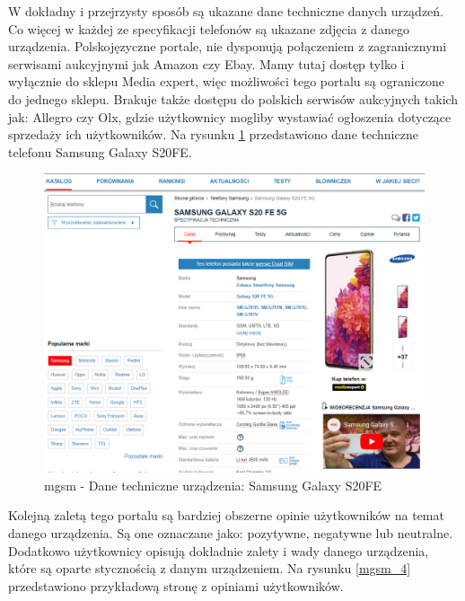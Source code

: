 W dokładny i przejrzysty sposób są ukazane dane techniczne danych urządzeń. Co więcej w każdej ze specyfikacji telefonów są ukazane zdjęcia z danego urządzenia. Polskojęzyczne portale, nie dysponują połączeniem z zagranicznymi serwisami aukcyjnymi jak Amazon czy Ebay. Mamy tutaj dostęp tylko i wyłącznie do sklepu Media expert, więc możliwości tego portalu są ograniczone do jednego sklepu.
Brakuje także dostępu do polskich serwisów aukcyjnych takich jak: Allegro czy Olx, gdzie użytkownicy mogliby wystawiać ogłoszenia dotyczące sprzedaży ich użytkowników. Na rysunku \ref*{mgsm_3} przedstawiono dane techniczne telefonu Samsung Galaxy S20FE.
\begin{figure}[H]
    \centering
    \includegraphics[scale=0.48]{img/mgsm/DetailsMgsm.png}
    \caption{mgsm - Dane techniczne urządzenia: Samsung Galaxy S20FE}
    \label{mgsm_3}
\end{figure}
Kolejną zaletą tego portalu są bardziej obszerne opinie użytkowników na temat danego urządzenia. Są one oznaczane jako: pozytywne, negatywne lub neutralne. Dodatkowo użytkownicy opisują dokładnie zalety i wady danego urządzenia, które są oparte stycznością z danym urządzeniem. Na rysunku \ref*{mgsm_4} przedstawiono przykładową stronę z opiniami użytkowników.
